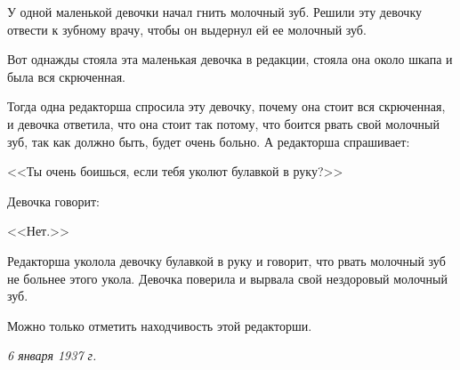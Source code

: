 У одной маленькой девочки начал гнить молочный зуб. Решили эту девочку отвести к зубному врачу, чтобы он выдернул ей ее молочный зуб.

Вот однажды стояла эта маленькая девочка в редакции, стояла она около шкапа и была вся скрюченная.

Тогда одна редакторша спросила эту девочку, почему она стоит вся скрюченная, и девочка ответила, что она стоит так потому, что боится рвать свой молочный зуб, так как должно быть, будет очень больно. А редакторша спрашивает:

<<Ты очень боишься, если тебя уколют булавкой в руку?>>

Девочка говорит:

<<Нет.>>

Редакторша уколола девочку булавкой в руку и говорит, что рвать молочный зуб не больнее этого укола. Девочка поверила и вырвала свой нездоровый молочный зуб.

Можно только отметить находчивость этой редакторши.

\medskip
\noindent\textit{6 января 1937 г.}